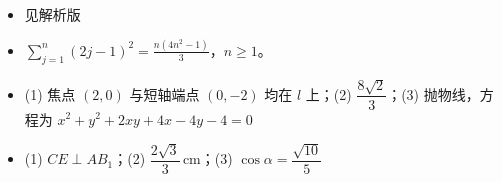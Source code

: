 \begin{itemize}[leftmargin=2.6em]
  \item[\textbf{1.}] 见解析版
  \item[\textbf{2.}] $\displaystyle\sum_{j=1}^{n}(2j-1)^2=\frac{n(4n^2-1)}3$，$n\ge1$。
  \item[\textbf{3.}] (1) 焦点 $(2,0)$ 与短轴端点 $(0,-2)$ 均在 $l$ 上；(2) $\dfrac{8\sqrt2}{3}$；(3) 抛物线，方程为 $x^2+y^2+2xy+4x-4y-4=0$
  \item[\textbf{4.}] (1) $CE\perp AB_1$；(2) $\dfrac{2\sqrt3}{3}\,\mathrm{cm}$；(3) $\cos\alpha=\dfrac{\sqrt{10}}5$
\end{itemize}
